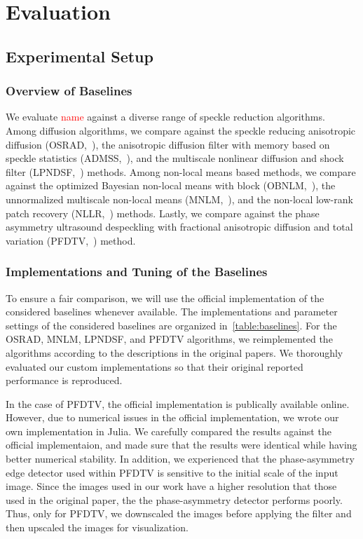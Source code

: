 
\section{Evaluation}

\subsection{Experimental Setup}
\subsubsection{Overview of Baselines}
We evaluate \textcolor{red}{name} against a diverse range of speckle reduction algorithms.
Among diffusion algorithms, we compare against the speckle reducing anisotropic diffusion (OSRAD,~\cite{krissian_oriented_2007}), the anisotropic diffusion filter with memory based on speckle statistics (ADMSS,~\cite{ramos-llorden_anisotropic_2015}), and the multiscale nonlinear diffusion and shock filter (LPNDSF,~\cite{zhang_multiscale_2006}) methods.
Among non-local means based methods, we compare against the optimized Bayesian non-local means with block (OBNLM,~\cite{coupe_nonlocal_2009}), the unnormalized multiscale non-local means (MNLM,~\cite{breivik_realtime_2017}), and the non-local low-rank patch recovery (NLLR,~\cite{zhu_nonlocal_2017}) methods.
Lastly, we compare against the phase asymmetry ultrasound despeckling with fractional anisotropic diffusion and total variation (PFDTV,~\cite{mei_phase_2020}) method.


%
\subsubsection{Implementations and Tuning of the Baselines}
To ensure a fair comparison, we will use the official implementation of the considered baselines whenever available.
The implementations and parameter settings of the considered baselines are organized in~\cref{table:baselines}.
For the OSRAD, MNLM, LPNDSF, and PFDTV algorithms, we reimplemented the algorithms according to the descriptions in the original papers.
We thoroughly evaluated our custom implementations so that their original reported performance is reproduced.

In the case of PFDTV, the official implementation is publically available online.
However, due to numerical issues in the official implementation, we wrote our own implementation in Julia.
We carefully compared the results against the official implementaion, and made sure that the results were identical while having better numerical stability.
In addition, we experienced that the phase-asymmetry edge detector used within PFDTV is sensitive to the initial scale of the input image.
Since the images used in our work have a higher resolution that those used in the original paper, the the phase-asymmetry detector performs poorly.
Thus, only for PFDTV, we downscaled the images before applying the filter and then upscaled the images for visualization.

